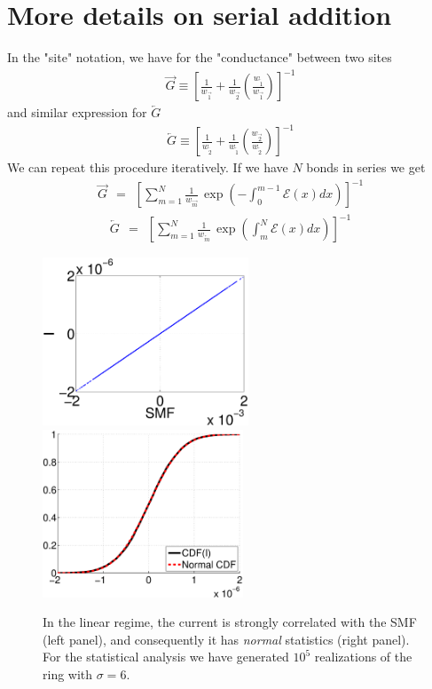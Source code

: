 \documentclass[aps,prl,floats,floatfix,twocolumn]{revtex4}
\newcommand{\beq}{\begin{eqnarray}}
\newcommand{\eeq}{\end{eqnarray}}
\begin{document}
\section{More details on serial addition}

In the "site" notation, we have for the "conductance" between two sites
\beq
\overrightarrow{G} \equiv 
\left[ \frac{1}{w_{\overrightarrow{1}}} + 
\frac{1}{w_{\overrightarrow{2}}} 
\left(\frac{w_{\overleftarrow{1}}}{w_{\overrightarrow{1}}}\right) \right]^{-1}
\eeq
%
and similar expression for $\overleftarrow{G}$
%
\beq
\overleftarrow{G} \equiv 
\left[ \frac{1}{w_{\overleftarrow{2}}} + 
\frac{1}{w_{\overleftarrow{1}}} 
\left(\frac{w_{\overrightarrow{2}}}{w_{\overleftarrow{2}}}\right) \right]^{-1}
\eeq
%
We can repeat this procedure iteratively.  If we 
have $N$ bonds in series we get
%
\beq
\overrightarrow{G} \  \ = \ \ \left[ \sum_{m=1}^N \frac{1}{w_{\overrightarrow{m}}} 
\,\exp\left(-\int_0^{m{-}1}\!\!\!\!\!\!\!\mathcal{E}(x)dx \right) \right]^{-1} 
\eeq
%
\beq
\overleftarrow{G} \  \ = \ \ \left[ \sum_{m=1}^N \frac{1}{w_{\overleftarrow{m}}} 
\,\exp\left(\int_m^{N}\!\!\mathcal{E}(x)dx \right) \right]^{-1} 
\eeq
%



\begin{figure}[H!]
\includegraphics[height=5cm]{lin2.eps}
\hspace*{2cm}
\includegraphics[height=5cm]{lin1.eps}

\caption{
In the linear regime, the current is strongly 
correlated with the SMF (left panel), and 
consequently it has {\em normal} statistics (right panel). 
For the statistical analysis we have generated $10^5$ 
realizations of the ring with $\sigma=6$. 
}
\label{fa1}
\end{figure}
\end{document}
